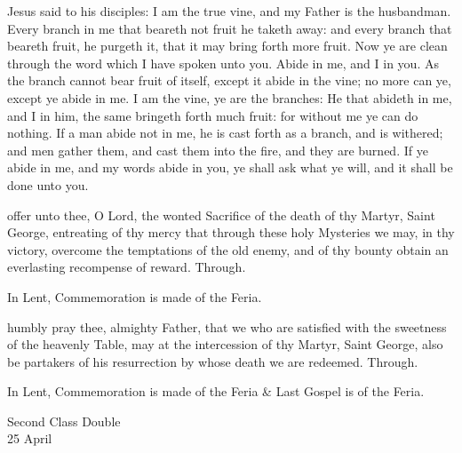 \vspace{-2ex}

 Jesus said to his disciples: I am the true vine, and my Father is the husbandman. Every branch in me that beareth not fruit he taketh away: and every branch that beareth fruit, he purgeth it, that it may bring forth more fruit. Now ye are clean through the word which I have spoken unto you. Abide in me, and I in you. As the branch cannot bear fruit of itself, except it abide in the vine; no more can ye, except ye abide in me. I am the vine, ye are the branches: He that abideth in me, and I in him, the same bringeth forth much fruit: for without me ye can do nothing. If a man abide not in me, he is cast forth as a branch, and is withered; and men gather them, and cast them into the fire, and they are burned. If ye abide in me, and my words abide in you, ye shall ask what ye will, and it shall be done unto you.

\secret
{} offer unto thee, O Lord, the wonted Sacrifice of the death of thy Martyr, Saint George, entreating of thy mercy that through these holy Mysteries we may, in thy victory, overcome the temptations of the old enemy, and of thy bounty obtain an everlasting recompense of reward. Through.
\begin{rubric}
    In Lent, Commemoration is made of the Feria.%
\end{rubric}


\postcommunion
{} humbly pray thee, almighty Father, that we who are satisfied with the sweetness of the heavenly Table, may at the intercession of thy Martyr, Saint George, also be partakers of his resurrection by whose death we are redeemed. Through.
\begin{rubric}
    In Lent, Commemoration is made of the Feria \& Last Gospel is of the Feria.
\end{rubric}

\clearpage

\begin{inhead}
    {Second Class Double\\
25 April}
\end{inhead}

